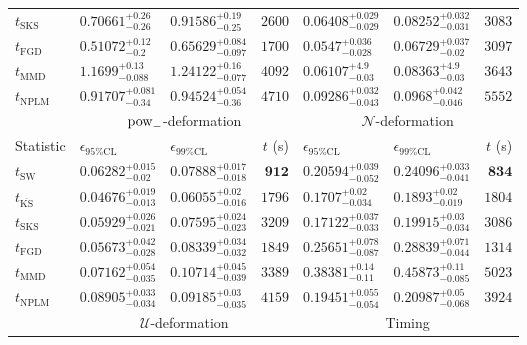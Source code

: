 \begin{tabular}{l|llr|llr}
	$t_{\mathrm{SKS}}$ & $0.70661_{-0.26}^{+0.26}$ & $0.91586_{-0.25}^{+0.19}$ & $2600$ & $0.06408_{-0.029}^{+0.029}$ & $0.08252_{-0.031}^{+0.032}$ & $3083$ \\
	$t_{\mathrm{FGD}}$ & ${\mathbf{0.51072_{-0.2}^{+0.12}}}$ & ${\mathbf{0.65629_{-0.097}^{+0.084}}}$ & $1700$ & $0.0547_{-0.028}^{+0.036}$ & ${\mathbf{0.06729_{-0.02}^{+0.037}}}$ & $3097$ \\
	$t_{\mathrm{MMD}}$ & $1.1699_{-0.088}^{+0.13}$ & $1.24122_{-0.077}^{+0.16}$ & $4092$ & $0.06107_{-0.03}^{+4.9}$ & $0.08363_{-0.03}^{+4.9}$ & $3643$ \\
\rowcolor{red!35}	$t_{\mathrm{NPLM}}$ & $0.91707_{-0.34}^{+0.081}$ & $0.94524_{-0.36}^{+0.054}$ & $4710$ & $0.09286_{-0.043}^{+0.032}$ & $0.0968_{-0.046}^{+0.042}$ & $5552$ \\
	\toprule
	\multicolumn{1}{c}{} & \multicolumn{3}{c}{$\rm{pow}_{-}$-deformation} & \multicolumn{3}{c}{$\mathcal{N}$-deformation} \\
Statistic & $\epsilon_{95\%\mathrm{CL}}$ & $\epsilon_{99\%\mathrm{CL}}$ & $t$ (s) & $\epsilon_{95\%\mathrm{CL}}$ & $\epsilon_{99\%\mathrm{CL}}$ & $t$ (s) \\
	\midrule
	$t_{\mathrm{SW}}$ & $0.06282_{-0.02}^{+0.015}$ & $0.07888_{-0.018}^{+0.017}$ & ${\mathbf{912}}$ & $0.20594_{-0.052}^{+0.039}$ & $0.24096_{-0.041}^{+0.033}$ & ${\mathbf{834}}$ \\
	$t_{\overline{\mathrm{KS}}}$ & ${\mathbf{0.04676_{-0.013}^{+0.019}}}$ & ${\mathbf{0.06055_{-0.016}^{+0.02}}}$ & $1796$ & ${\mathbf{0.1707_{-0.034}^{+0.02}}}$ & ${\mathbf{0.1893_{-0.019}^{+0.02}}}$ & $1804$ \\
	$t_{\mathrm{SKS}}$ & $0.05929_{-0.021}^{+0.026}$ & $0.07595_{-0.023}^{+0.024}$ & $3209$ & $0.17122_{-0.033}^{+0.037}$ & $0.19915_{-0.034}^{+0.03}$ & $3086$ \\
	$t_{\mathrm{FGD}}$ & $0.05673_{-0.028}^{+0.042}$ & $0.08339_{-0.032}^{+0.034}$ & $1849$ & $0.25651_{-0.087}^{+0.078}$ & $0.28839_{-0.044}^{+0.071}$ & $1314$ \\
	$t_{\mathrm{MMD}}$ & $0.07162_{-0.035}^{+0.054}$ & $0.10714_{-0.039}^{+0.045}$ & $3389$ & $0.38381_{-0.11}^{+0.14}$ & $0.45873_{-0.085}^{+0.11}$ & $5023$ \\
\rowcolor{red!35}	$t_{\mathrm{NPLM}}$ & $0.08905_{-0.034}^{+0.033}$ & $0.09185_{-0.035}^{+0.03}$ & $4159$ & $0.19451_{-0.054}^{+0.055}$ & $0.20987_{-0.068}^{+0.05}$ & $3924$ \\
	\toprule
	\multicolumn{1}{c}{} & \multicolumn{3}{c}{$\mathcal{U}$-deformation} & \multicolumn{3}{c}{Timing} \\

\end{tabular}

